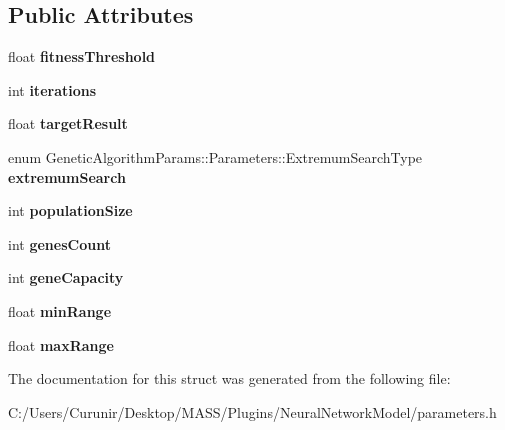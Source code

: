 \subsection*{Public Attributes}
\begin{DoxyCompactItemize}
\item 
\mbox{\label{struct_genetic_algorithm_params_1_1_parameters_a2d4b36153aa65aed6fa0996f17e73c36}} 
float {\bfseries fitness\+Threshold}
\item 
\mbox{\label{struct_genetic_algorithm_params_1_1_parameters_a130a1e03f3a445caa0e0a00d6f2f21fd}} 
int {\bfseries iterations}
\item 
\mbox{\label{struct_genetic_algorithm_params_1_1_parameters_ad9bde581bef9239129cfdbe2d78ff514}} 
float {\bfseries target\+Result}
\item 
\mbox{\label{struct_genetic_algorithm_params_1_1_parameters_a51c4b0811c004fe1419d9a20bd014ba7}} 
enum Genetic\+Algorithm\+Params\+::\+Parameters\+::\+Extremum\+Search\+Type {\bfseries extremum\+Search}
\item 
\mbox{\label{struct_genetic_algorithm_params_1_1_parameters_a8355f423b6b1015ff239b59ef391b067}} 
int {\bfseries population\+Size}
\item 
\mbox{\label{struct_genetic_algorithm_params_1_1_parameters_a3e988ba9f53c8ca2338c2b12e05e54de}} 
int {\bfseries genes\+Count}
\item 
\mbox{\label{struct_genetic_algorithm_params_1_1_parameters_a8cdc92e995b4f84fb7f80b9348f193fe}} 
int {\bfseries gene\+Capacity}
\item 
\mbox{\label{struct_genetic_algorithm_params_1_1_parameters_a2f70a84e27bbecc6b032c1cc73052fca}} 
float {\bfseries min\+Range}
\item 
\mbox{\label{struct_genetic_algorithm_params_1_1_parameters_ae6366f636b54fa8753bc4117dab9392f}} 
float {\bfseries max\+Range}
\end{DoxyCompactItemize}


The documentation for this struct was generated from the following file\+:\begin{DoxyCompactItemize}
\item 
C\+:/\+Users/\+Curunir/\+Desktop/\+M\+A\+S\+S/\+Plugins/\+Neural\+Network\+Model/parameters.\+h\end{DoxyCompactItemize}
